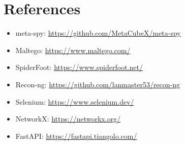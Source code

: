 \documentclass[13pt,a4paper]{report}
\begin{document}
\chapter{References}
\begin{itemize}
    \item meta-spy: \url{https://github.com/MetaCubeX/meta-spy}
    \item Maltego: \url{https://www.maltego.com/}
    \item SpiderFoot: \url{https://www.spiderfoot.net/}
    \item Recon-ng: \url{https://github.com/lanmaster53/recon-ng}
    \item Selenium: \url{https://www.selenium.dev/}
    \item NetworkX: \url{https://networkx.org/}
    \item FastAPI: \url{https://fastapi.tiangolo.com/}
\end{itemize}
\end{document}

